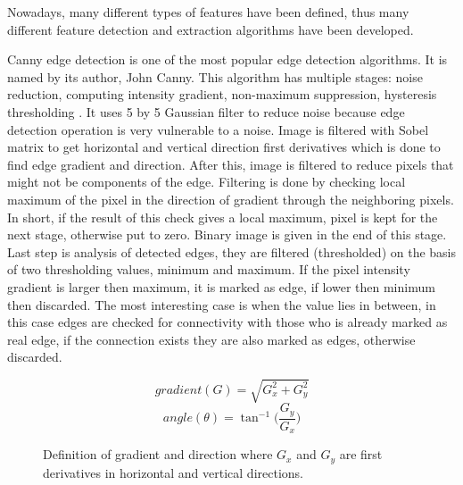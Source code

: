 \documentclass[../../../../main]{subfiles}
\begin{document}
Nowadays, many different types of features have been defined, thus many different feature detection and extraction algorithms have been developed.

Canny edge detection is one of the most popular edge detection algorithms. It is named by its author, John Canny. This algorithm has multiple stages: noise reduction, computing intensity gradient, non-maximum suppression, hysteresis thresholding \cite{opencv_docs_canny}. It uses 5 by 5 Gaussian filter to reduce noise because edge detection operation is very vulnerable to a noise. Image is filtered with Sobel matrix \cite{opencv_docs_sobel_derivatives} to get horizontal and vertical direction first derivatives which is done to find edge gradient and direction. After this, image is filtered to reduce pixels that might not be components of the edge. Filtering is done by checking local maximum of the pixel in the direction of gradient through the neighboring pixels. In short, if the result of this check gives a local maximum, pixel is kept for the next stage, otherwise put to zero. Binary image is given in the end of this stage. Last step is analysis of detected edges, they are filtered (thresholded) on the basis of two thresholding values, minimum and maximum. If the pixel intensity gradient is larger then maximum, it is marked as edge, if lower then minimum then discarded. The most interesting case is when the value lies in between, in this case edges are checked for connectivity with those who is already marked as real edge, if the connection exists they are also marked as edges, otherwise discarded.

\begin{figure} [!ht]
  \centering    
    \begin{equation}
        gradient(G) = \sqrt{G_x^2+G_y^2}
    \end{equation}
     \begin{equation}
        angle(\theta) = \tan^{-1}\bigg(\frac{G_y}{G_x}\bigg)
    \end{equation}
  \caption{Definition of gradient and direction where $G_x$ and $G_y$ are first derivatives in horizontal and vertical directions.}
\end{figure}
\end{document}
